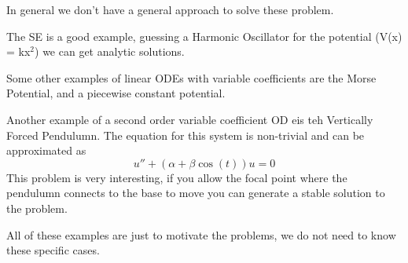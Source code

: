 \documentclass{article}
\newcommand{\be}{\begin{equation}}
\newcommand{\ee}{\end{equation}}
\begin{document}
In general we don't have a general approach to solve these problem.

The SE is a  good example, guessing a Harmonic Oscillator for the potential (V(x) = kx$^2$) we can get analytic solutions.

Some other examples of linear ODEs with variable coefficients are the Morse Potential, and a piecewise constant potential.

Another example of a second order variable coefficient OD eis teh Vertically Forced Pendulumn.
The equation for this system is non-trivial and can be approximated as
\be
u'' + (\alpha + \beta\cos(t)) u = 0
\ee
This problem is very interesting, if you allow the focal point where the pendulumn connects to the base to move you can generate a stable solution to the problem.

All of these examples are just to motivate the problems, we do not need to know these specific cases.
\end{document}
